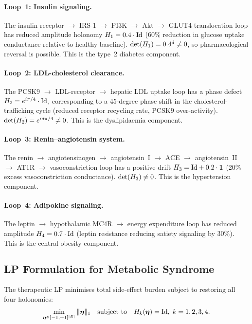 \paragraph{Loop~1: Insulin signaling.}
The insulin receptor $\to$ IRS-1 $\to$ PI3K $\to$ Akt $\to$ GLUT4
translocation loop has reduced amplitude holonomy $H_1 = 0.4\cdot\mathrm{Id}$
(60\% reduction in glucose uptake conductance relative to healthy baseline).
$\det(H_1) = 0.4^d \neq 0$, so pharmacological reversal is possible.
This is the type~2 diabetes component.

\paragraph{Loop~2: LDL-cholesterol clearance.}
The PCSK9 $\to$ LDL-receptor $\to$ hepatic LDL uptake loop has a phase
defect $H_2 = e^{i\pi/4}\cdot\mathrm{Id}$, corresponding to a 45-degree
phase shift in the cholesterol-trafficking cycle (reduced receptor recycling
rate, PCSK9 over-activity).  $\det(H_2) = e^{id\pi/4} \neq 0$.
This is the dyslipidaemia component.

\paragraph{Loop~3: Renin--angiotensin system.}
The renin $\to$ angiotensinogen $\to$ angiotensin~I $\to$ ACE $\to$
angiotensin~II $\to$ AT1R $\to$ vasoconstriction loop has a positive drift
$H_3 = \mathrm{Id} + 0.2\cdot\mathbf{1}$ (20\% excess vasoconstriction
conductance).  $\det(H_3) \neq 0$.  This is the hypertension component.

\paragraph{Loop~4: Adipokine signaling.}
The leptin $\to$ hypothalamic MC4R $\to$ energy expenditure loop has reduced
amplitude $H_4 = 0.7\cdot\mathrm{Id}$ (leptin resistance reducing
satiety signaling by 30\%).  This is the central obesity component.

\subsection{LP Formulation for Metabolic Syndrome}
\label{subsec:ch09-metsyn-lp}

The therapeutic LP minimises total side-effect burden subject to restoring
all four holonomies:
\begin{equation}
  \min_{\boldsymbol{\eta}\in[-1,+1]^{|E|}} \|\boldsymbol{\eta}\|_1
  \quad\text{subject to}\quad
  H_k(\boldsymbol{\eta}) = \mathrm{Id},\; k = 1,2,3,4.
  \label{eq:ch09-metsyn-lp}
\end{equation}

